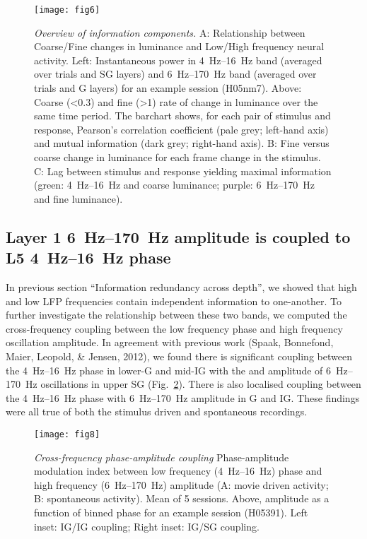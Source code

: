 \begin{figure}[htbp]
\centering \texttt{[image: fig6]}
%
\caption{%
\textit{Overview of information components.}
A: Relationship between Coarse/Fine changes in luminance and Low/High frequency neural activity.
Left: Instantaneous power in \SIrange{4}{16}{Hz} band (averaged over trials and \ac{SG} layers) and \SIrange{6}{170}{Hz} band (averaged over trials and \ac{G} layers) for an example session (H05nm7).
Above: Coarse (\SI{<0.3}{\cpd}) and fine (\SI{>1}{\cpd}) rate of change in luminance over the same time period.
The barchart shows, for each pair of stimulus and response, Pearson's correlation coefficient (pale grey; left-hand axis) and mutual information (dark grey; right-hand axis).
B: Fine versus coarse change in luminance for each frame change in the stimulus.
C: Lag between stimulus and response yielding maximal information (green: \SIrange{4}{16}{Hz} and coarse luminance; purple: \SIrange{6}{170}{Hz} and fine luminance).}%
\label{fig:lam_6}
%
\end{figure}

\subsection{Layer 1 \SIrange{6}{170}{Hz} amplitude is coupled to L5 \SIrange{4}{16}{Hz} phase}
In previous section ``Information redundancy across depth'', we showed that high and low \ac{LFP} frequencies contain independent information to one-another.
To further investigate the relationship between these two bands, we computed the cross-frequency coupling between the low frequency phase and high frequency oscillation amplitude.
In agreement with previous work (Spaak, Bonnefond, Maier, Leopold, \& Jensen, 2012), we found there is significant coupling between the \SIrange{4}{16}{Hz} phase in lower-\ac{G} and mid-\ac{IG} with the and amplitude of \SIrange{6}{170}{Hz} oscillations in upper \ac{SG} (Fig.~\ref{fig:lam_8}).
There is also localised coupling between the \SIrange{4}{16}{Hz} phase with \SIrange{6}{170}{Hz} amplitude in \ac{G} and \ac{IG}.
These findings were all true of both the stimulus driven and spontaneous recordings.

\begin{figure}[htbp]
\centering \texttt{[image: fig8]}
%
\caption{%
\textit{Cross-frequency phase-amplitude coupling}
Phase-amplitude modulation index between low frequency (\SIrange{4}{16}{Hz}) phase and high 
frequency (\SIrange{6}{170}{Hz}) amplitude (A: movie driven activity; B: spontaneous 
activity).
Mean of 5 sessions.
Above, amplitude as a function of binned phase for an example session (H05391).
Left inset: \ac{IG}/\ac{IG} coupling; Right inset: \ac{IG}/\ac{SG} coupling.}%
\label{fig:lam_8}
%
\end{figure}

